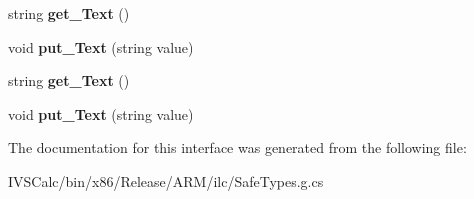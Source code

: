 \begin{DoxyCompactItemize}
\mbox{\label{interface_windows_1_1_u_i_1_1_xaml_1_1_documents_1_1_i_run_aba9ba75d04a782c32cbb2d70e3aef9c0}} 
string {\bfseries get\+\_\+\+Text} ()
\item 
\mbox{\label{interface_windows_1_1_u_i_1_1_xaml_1_1_documents_1_1_i_run_af328b828b9f7a37c37d715c2bc5f8552}} 
void {\bfseries put\+\_\+\+Text} (string value)
\item 
\mbox{\label{interface_windows_1_1_u_i_1_1_xaml_1_1_documents_1_1_i_run_aba9ba75d04a782c32cbb2d70e3aef9c0}} 
string {\bfseries get\+\_\+\+Text} ()
\item 
\mbox{\label{interface_windows_1_1_u_i_1_1_xaml_1_1_documents_1_1_i_run_af328b828b9f7a37c37d715c2bc5f8552}} 
void {\bfseries put\+\_\+\+Text} (string value)
\end{DoxyCompactItemize}


The documentation for this interface was generated from the following file\+:\begin{DoxyCompactItemize}
\item 
I\+V\+S\+Calc/bin/x86/\+Release/\+A\+R\+M/ilc/Safe\+Types.\+g.\+cs\end{DoxyCompactItemize}
